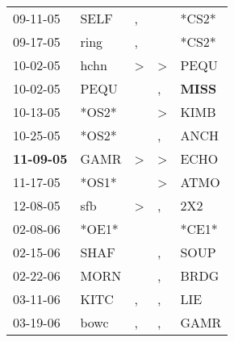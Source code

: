 \begin{supertabular}{p{0.07\textwidth}p{0.06\textwidth}p{0.02\textwidth}p{0.02\textwidth}p{0.06\textwidth}}
          09-11-05\textsuperscript{} &           SELF\textsuperscript{} &                , &                  &                            *CS2* \\
          09-17-05\textsuperscript{} &           ring\textsuperscript{} &                , &                  &                            *CS2* \\
          10-02-05\textsuperscript{} &           hchn\textsuperscript{} &     \textgreater &     \textgreater &           PEQU\textsuperscript{} \\
          10-02-05\textsuperscript{} &           PEQU\textsuperscript{} &                  &                , &  \textbf{MISS\textsuperscript{}} \\
          10-13-05\textsuperscript{} &                            *OS2* &                  &     \textgreater &           KIMB\textsuperscript{} \\
          10-25-05\textsuperscript{} &                            *OS2* &                  &                , &           ANCH\textsuperscript{} \\
 \textbf{11-09-05\textsuperscript{}} &           GAMR\textsuperscript{} &     \textgreater &     \textgreater &           ECHO\textsuperscript{} \\
          11-17-05\textsuperscript{} &                            *OS1* &                  &     \textgreater &           ATMO\textsuperscript{} \\
          12-08-05\textsuperscript{} &            sfb\textsuperscript{} &     \textgreater &                , &            2X2\textsuperscript{} \\
          02-08-06\textsuperscript{} &                            *OE1* &                  &                  &                            *CE1* \\
          02-15-06\textsuperscript{} &           SHAF\textsuperscript{} &                  &                , &           SOUP\textsuperscript{} \\
          02-22-06\textsuperscript{} &           MORN\textsuperscript{} &                  &                , &           BRDG\textsuperscript{} \\
          03-11-06\textsuperscript{} &           KITC\textsuperscript{} &                , &                , &            LIE\textsuperscript{} \\
          03-19-06\textsuperscript{} &           bowc\textsuperscript{} &                , &                , &           GAMR\textsuperscript{} \\

\end{supertabular}

